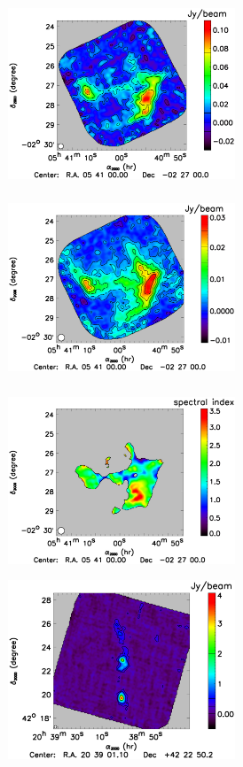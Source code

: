 \begin{figure}[t!]
\begin{center}
\includegraphics[height=5cm,width=6cm]{figures/The_Horse_Head_Nebula_1mm.ps} 
\includegraphics[height=5cm,width=6cm]{figures/The_Horse_Head_Nebula_2mm.ps}
\includegraphics[height=5cm,width=6cm]{figures/The_Horse_Head_Nebula_spectrum_map.ps}
\includegraphics[width=6cm]{figures/DR21OH_1mm.ps} 

\end{center}
\end{figure}
